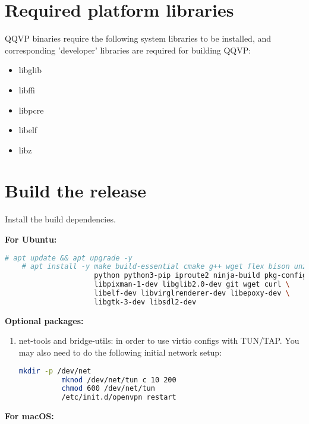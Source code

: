 \section{Required platform libraries}

QQVP binaries require the following system libraries to be installed, and corresponding 'developer' libraries are required for building QQVP:

\begin{itemize}
\item libglib
\item libffi
\item libpcre
\item libelf
\item libz
\end{itemize}


\section{Build the release}

Install the build dependencies.

\textbf{For Ubuntu:}

\small
\begin{lstlisting}[language=bash]
    # apt update && apt upgrade -y
    # apt install -y make build-essential cmake g++ wget flex bison unzip \
                     python python3-pip iproute2 ninja-build pkg-config \
                     libpixman-1-dev libglib2.0-dev git wget curl \
                     libelf-dev libvirglrenderer-dev libepoxy-dev \
                     libgtk-3-dev libsdl2-dev
\end{lstlisting}
\normalsize

\textbf{Optional packages:}

\begin{enumerate}
  \item net-tools and bridge-utils: in order to use virtio configs with TUN/TAP.
        You may also need to do the following initial network setup:
        \small
        \begin{lstlisting}[language=bash]
          mkdir -p /dev/net
          mknod /dev/net/tun c 10 200
          chmod 600 /dev/net/tun
          /etc/init.d/openvpn restart
        \end{lstlisting}
        \normalsize
\end{enumerate}

\clearpage
\textbf{For macOS:}

